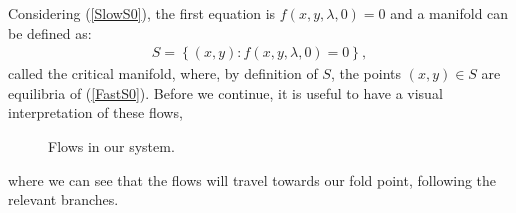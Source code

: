 Considering (\ref{SlowS0}), the first equation is $f(x,y,\lambda, 0)=0$ and a manifold can be defined as:
\begin{align} \label{CriticalS}
S= \left\{ (x,y) : f(x,y,\lambda, 0)=0 \right \},
\end{align}
called the critical manifold, where, by definition of $S$, the points $(x,y) \in S$ are equilibria of (\ref{FastS0}). Before we continue, it is useful to have a visual interpretation of these flows, 
\begin{figure}[h!]\centering
	\caption{Flows in our \vdp system.}
	\label{fig: vdp flow diagram}
\end{figure}
where we can see that the flows will travel towards our fold point, following the relevant branches.
